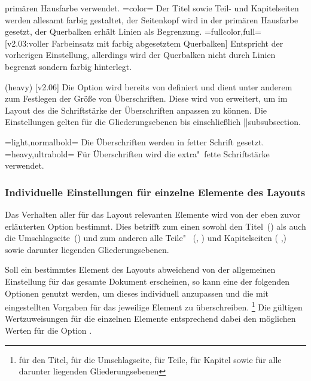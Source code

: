 \begin{DeclareEntity*}{}
\begin{DeclareEntity*}{}
\begin{DeclareEntity*}{}
\begin{Declaration}
\begin{DeclareValues}
  primären Hausfarbe verwendet.
\itemval=color=
  Der Titel sowie Teil- und Kapitelseiten werden allesamt farbig gestaltet, 
  der Seitenkopf wird in der primären Hausfarbe  gesetzt, der 
  Querbalken erhält Linien als Begrenzung.
\itemval=fullcolor,full=%
    [v2.03:voller Farbeinsatz mit farbig abgesetztem Querbalken]
  Entspricht der vorherigen Einstellung, allerdings wird der Querbalken nicht 
  durch Linien begrenzt sondern farbig hinterlegt.
\end{DeclareValues}
\end{Declaration}
\newcommand*\cdalias{false,true,lightcolor,barcolor,bicolor,color,fullcolor}

\begin{Declaration}
  {}
  (heavy)
  [v2.06]
Die Option  wird bereits von \KOMAScript definiert und 
dient unter anderem zum Festlegen der Größe von Überschriften. Diese wird von 
\TUDScript erweitert, um im Layout des \CDs die Schriftstärke der Überschriften 
anpassen zu können. Die Einstellungen gelten für die Gliederungsebenen bis 
einschließlich \Macro||{subsubsection}.
\begin{DeclareValues}
\itemval=light,normalbold=
  Die Überschriften werden in fetter Schrift gesetzt.
\itemval=heavy,ultrabold=
  Für Überschriften wird die extra"~fette Schriftstärke verwendet.
\end{DeclareValues}
\end{Declaration}



\subsubsection{Individuelle Einstellungen für einzelne Elemente des Layouts}
%
Das Verhalten aller für das Layout relevanten Elemente wird von der eben zuvor 
erläuterten Option  bestimmt. Dies betrifft zum einen sowohl 
den Titel~() als auch die Umschlagseite~() 
und zum anderen alle Teile"~ (, ) und Kapitelseiten 
( ,) sowie darunter liegenden Gliederungsebenen.

Soll ein bestimmtes Element des Layouts abweichend von der allgemeinen 
Einstellung für das gesamte Dokument erscheinen, so kann eine der folgenden 
Optionen genutzt werden, um dieses individuell anzupassen und die mit 
 eingestellten Vorgaben für das jeweilige Element zu 
überschreiben.%
\footnote{%
   für den Titel,  für die Umschlagseite,
   für Teile,  für Kapitel sowie
   für alle darunter liegenden Gliederungsebenen%
}
Die gültigen Wertzuweisungen für die einzelnen Elemente entsprechend dabei den 
möglichen Werten für die Option . 


\end{DeclareEntity*}
\end{DeclareEntity*}
\end{DeclareEntity*}
